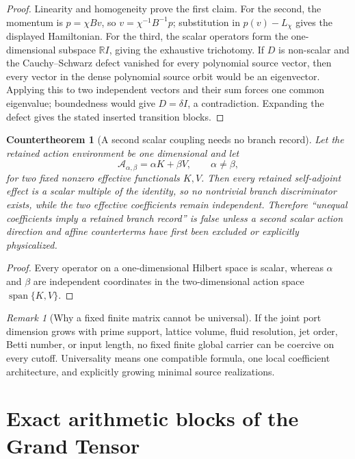 \documentclass[11pt]{article}
\newtheorem{countertheorem}[theorem]{Countertheorem}
\theoremstyle{definition}
\theoremstyle{remark}
\newtheorem{remark}[theorem]{Remark}
\newcommand{\R}{\mathbb R}
\newcommand{\Span}{\operatorname{span}}
\begin{document}
\begin{proof}
Linearity and homogeneity prove the first claim.  For the second, the momentum
is $p=\chi Bv$, so $v=\chi^{-1}B^{-1}p$; substitution in
$p(v)-L_\chi$ gives the displayed Hamiltonian.  For the third, the scalar
operators form the one-dimensional subspace $\R I$, giving the exhaustive
trichotomy.  If $D$ is non-scalar and the Cauchy--Schwarz defect vanished for
every polynomial source vector, then every vector in the dense polynomial
source orbit would be an eigenvector.  Applying this to two independent
vectors and their sum forces one common eigenvalue; boundedness would give
$D=\delta I$, a contradiction.  Expanding the defect gives the stated inserted
transition blocks.
\end{proof}

\begin{countertheorem}[A second scalar coupling needs no branch record]
\label{cth:scalar-coupling-no-record-master}
Let the retained action environment be one dimensional and let
\[
 \mathscr A_{\alpha,\beta}=\alpha K+\beta V,
 \qquad \alpha\ne\beta,
\]
for two fixed nonzero effective functionals $K,V$.  Then every retained
self-adjoint effect is a scalar multiple of the identity, so no nontrivial
branch discriminator exists, while the two effective coefficients remain
independent.  Therefore ``unequal coefficients imply a retained branch
record'' is false unless a second scalar action direction and affine
counterterms have first been excluded or explicitly physicalized.
\end{countertheorem}

\begin{proof}
Every operator on a one-dimensional Hilbert space is scalar, whereas
$\alpha$ and $\beta$ are independent coordinates in the two-dimensional
action space $\Span\{K,V\}$.
\end{proof}

\begin{remark}[Why a fixed finite matrix cannot be universal]
If the joint port dimension grows with prime support, lattice volume, fluid
resolution, jet order, Betti number, or input length, no fixed finite global
carrier can be coercive on every cutoff.  Universality means one compatible
formula, one local coefficient architecture, and explicitly growing minimal
source realizations.
\end{remark}

\section{Exact arithmetic blocks of the Grand Tensor}
\label{sec:arithmetic-blocks}
\end{document}
